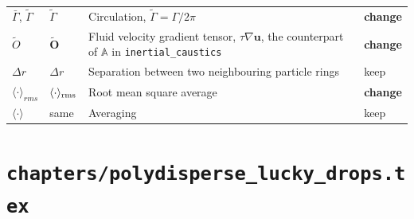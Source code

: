 \documentclass[11pt,a4paper]{article}
\newcommand{\mb}[1]{\mathbb{#1}}
\renewcommand{\vec}[1]{\boldsymbol{#1}}
\newcommand{\chg}{\textbf{change}}
\newcommand{\kp}{keep}
\begin{document}
\begin{longtable}{@{}p{3.1cm} p{3.1cm} p{8.6cm} p{1.6cm}@{}}
$\bar{\Gamma}$, $\tilde{\Gamma}$ & $\tilde{\Gamma}$ & Circulation, $\tilde{\Gamma} = \Gamma/2\pi$ & \chg \\
$\tilde{O}$ & $\tilde{\mathbf{O}}$ & Fluid velocity gradient tensor, $\tau\nabla\vec{u}$, the counterpart of $\mb{A}$ in \texttt{inertial\_caustics} & \chg \\
$\Delta r$ & $\Delta r$ & Separation between two neighbouring particle rings & \kp \\
$\langle\cdot\rangle_{rms}$ & $\langle\cdot\rangle_{\rm rms}$ & Root mean square average & \chg \\
$\langle\cdot\rangle$ & same & Averaging & \kp \\
\bottomrule
\end{longtable}

\section*{\texttt{chapters/polydisperse\_lucky\_drops.tex}}
\end{document}
